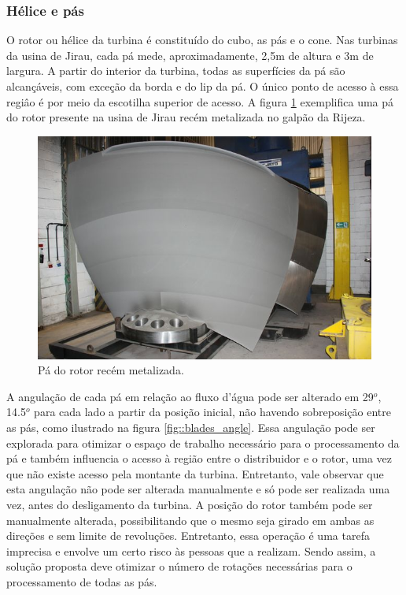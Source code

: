 \subsubsection{Hélice e pás}
 
O rotor ou hélice da turbina é constituído do cubo, as pás e o cone. 
Nas turbinas da usina de Jirau, cada pá mede, aproximadamente, 2,5m de altura e
3m de largura. A partir do interior da turbina, todas as superfícies da pá são
alcançáveis, com exceção da borda e do lip da pá. O único ponto de acesso à
essa regiâo é por meio da escotilha superior de acesso. A figura
\ref{fig::blade_rijeza} exemplifica uma pá do rotor presente na usina de Jirau recém metalizada no galpão da Rijeza.

\begin{figure}[h!]	
	\includegraphics[width=\columnwidth]{sota/figs/viagem/img_4887}
	\caption{Pá do rotor recém metalizada.}
	\label{fig::blade_rijeza}
\end{figure}

A angulação de cada pá em relação ao fluxo d'água pode ser alterado em 29$^o$,
14.5$^o$ para cada lado a partir da posição inicial, não havendo sobreposição
entre as pás, como ilustrado na figura \ref{fig::blades_angle}.
Essa angulação pode ser explorada para otimizar o espaço de trabalho necessário
para o processamento da pá e também influencia o acesso à região
entre o distribuidor e o rotor, uma vez que não existe acesso pela montante da
turbina. Entretanto, vale observar que esta angulação não pode ser alterada
manualmente e só pode ser realizada uma vez, antes do desligamento da turbina. A
posição do rotor também pode ser manualmente alterada, possibilitando que o mesmo seja girado em ambas as direções e sem limite de revoluções. Entretanto, essa operação é uma tarefa imprecisa e envolve um certo risco às pessoas que a realizam. Sendo
assim, a solução proposta deve otimizar o número de rotações necessárias para o processamento de todas as pás.

